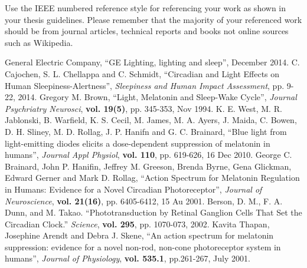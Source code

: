 Use the IEEE numbered reference style for referencing your work as shown in your thesis guidelines.
Please remember that the majority of your referenced work should be from journal articles, technical
reports and books not online sources such as Wikipedia.

\begin{thebibliography}{5}

 General Electric Company, ``GE Lighting, lighting and sleep'', December 2014.
 C. Cajochen, S. L. Chellappa and C. Schmidt, ``Circadian and Light Effects on Human Sleepiness-Alertness'', \emph{Sleepiness and Human Impact Assessment}, pp. 9-22, 2014.
 Gregory M. Brown, ``Light, Melatonin and Sleep-Wake Cycle'', \emph{Journal Psychriatry Neurosci}, {\bf vol. 19(5)}, pp. 345-353, Nov 1994.
 K. E. West, M. R. Jablonski, B. Warfield, K. S. Cecil, M. James, M. A. Ayers, J. Maida, C. Bowen, D. H. Sliney, M. D. Rollag, J. P. Hanifn and G. C. Brainard, ``Blue light from light-emitting diodes elicits a dose-dependent suppression of melatonin in humans'', \emph{Journal Appl Physiol}, {\bf vol. 110}, pp. 619-626, 16 Dec 2010.
 George C. Brainard, John P. Hanifin, Jeffrey M. Greeson, Brenda Byrne, Gena Glickman, Edward Gerner and Mark D. Rollag, ``Action Spectrum for Melatonin Regulation in Humans: Evidence for a Novel Circadian Photoreceptor'', \emph{Journal of Neuroscience}, {\bf vol. 21(16)}, pp. 6405-6412, 15 Au 2001.
 Berson, D. M., F. A. Dunn, and M. Takao. ``Phototransduction by Retinal Ganglion Cells That Set the Circadian Clock.'' \emph{Science}, {\bf vol. 295}, pp. 1070-073, 2002.
 Kavita Thapan, Josephine Arendt and Debra J. Skene, ``An action spectrum for melatonin suppression: evidence for a novel non-rod, non-cone photoreceptor system in humans'', \emph{Journal of Physiology}, {\bf vol. 535.1}, pp.261-267, July 2001.

\end{thebibliography}
